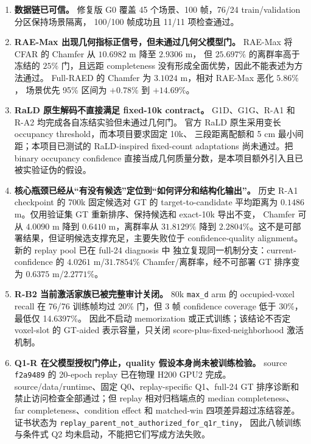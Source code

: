 \documentclass[11pt,a4paper,fontset=none]{ctexart}
\newcommand{\code}[1]{\texttt{#1}}
\begin{document}
\begin{enumerate}
  \item \textbf{数据链已可信。}
  修复版 G0 覆盖 45 个场景、100 帧，76/24 train/validation 分区保持场景隔离，
  100/100 帧成功且 11/11 项检查通过。

  \item \textbf{RAE-Max 出现几何指标正信号，但未通过几何父模型门。}
  RAE-Max 将 CFAR 的 Chamfer 从 $10.6982$ m 降至 $2.9306$ m，
  但 $25.697\%$ 的离群率高于冻结的 $25\%$ 门，且远距 completeness
  没有形成全面优势，因此不能表述为方法通过。
  Full-RAED 的 Chamfer 为 $3.1024$ m，相对 RAE-Max 恶化 $5.86\%$，
  场景优先 95\% 区间为 $+0.78\%$ 到 $+14.69\%$。

  \item \textbf{RaLD 原生解码不直接满足 fixed-10k contract。}
  G1D、G1G、R-A1 和 R-A2 均完成各自冻结实验但未通过几何门。
  官方 RaLD 原生采用变长 occupancy threshold，而本项目要求固定 10k、
  三段距离配额和 5 cm 最小间距；本项目已测试的 RaLD-inspired fixed-count
  adaptations 尚未通过。把 binary occupancy confidence
  直接当成几何质量分数，是本项目额外引入且已被实验证伪的假设。

  \item \textbf{核心瓶颈已经从“有没有候选”定位到“如何评分和结构化输出”。}
  历史 R-A1 checkpoint 的 700k 固定候选对 GT 的 target-to-candidate 平均距离为
  $0.1486$ m。仅用验证集 GT 重新排序、保持候选和 exact-10k 导出不变，
  Chamfer 可从 $4.0090$ m 降到 $0.6410$ m，离群率从 $31.8129\%$
  降到 $2.2804\%$。这不是可部署结果，但证明候选支撑充足，主要失败位于
  confidence-quality alignment。新的 replay pool 已在 full-24 diagnosis 中
  独立复现同一机制分支：current-confidence 的 $4.0261$ m/$31.7854\%$
  Chamfer/离群率，经不可部署 GT 排序变为 $0.6375$ m/$2.2771\%$。

  \item \textbf{R-B2 当前激活家族已被完整审计关闭。}
  80k \code{max\_d} arm 的 occupied-voxel recall 在 76/76 训练帧均过
  20\% 门，但 3 帧 confidence coverage 低于 30\%，最低仅 14.6397\%。
  因此不启动 memorization 或正式训练；该结论不否定 voxel-slot 的
  GT-aided 表示容量，只关闭 score-plus-fixed-neighborhood 激活机制。

  \item \textbf{Q1-R 在父模型授权门停止，quality 假设本身尚未被训练检验。}
  source \code{f2a9489} 的 20-epoch replay 已在物理 H200 GPU2 完成。
  source/data/runtime、固定 Q0、replay-specific Q1、full-24 GT 排序诊断和
  禁止访问检查全部通过；但 replay 相对归档端点的 median completeness、
  far completeness、condition effect 和 matched-win 四项差异超过冻结容差。
  证书状态为 \code{replay\_parent\_not\_authorized\_for\_q1r\_tiny}，
  因此八帧训练与条件式 Q2 均未启动，不能把它们写成方法失败。


\end{enumerate}
\end{document}
